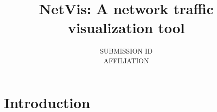 

\title[NetVis Network Traffic Visualization]%
      {NetVis: A network traffic visualization tool}

\author[SUBMISSION ID]
       {SUBMISSION ID
        \\ AFFILIATION
       }


%





\maketitle

\begin{abstract}

\begin{classification} %
\end{classification}
\end{abstract}

\section{Introduction}


